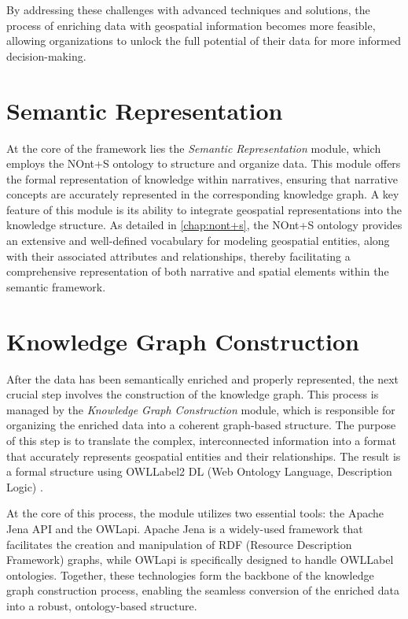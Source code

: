 By addressing these challenges with advanced techniques and solutions, the process of enriching data with geospatial information becomes more feasible, allowing organizations to unlock the full potential of their data for more informed decision-making.

\section{Semantic Representation}\label{VI-sec:semantic-representation}

At the core of the framework lies the \textit{Semantic Representation} module, which employs the NOnt+S ontology to structure and organize data. This module offers the formal representation of knowledge within narratives, ensuring that narrative concepts are accurately represented in the corresponding knowledge graph. A key feature of this module is its ability to integrate geospatial representations into the knowledge structure. As detailed in \ref{chap:nont+s}, the NOnt+S ontology provides an extensive and well-defined vocabulary for modeling geospatial entities, along with their associated attributes and relationships, thereby facilitating a comprehensive representation of both narrative and spatial elements within the semantic framework.

\section{Knowledge Graph Construction}\label{VI-sec:KG}

After the data has been semantically enriched and properly represented, the next crucial step involves the construction of the knowledge graph. This process is managed by the \textit{Knowledge Graph Construction} module, which is responsible for organizing the enriched data into a coherent graph-based structure. The purpose of this step is to translate the complex, interconnected information into a format that accurately represents geospatial entities and their relationships. The result is a formal structure using \acrshort{OWLLabel}2 DL (Web Ontology Language, Description Logic) \cite{OWLWebOntologyc}.

At the core of this process, the module utilizes two essential tools: the Apache Jena API\cite{ApacheJenaFramework} and the OWLapi\cite{OwlcsOwlapi2024}. Apache Jena is a widely-used framework that facilitates the creation and manipulation of RDF (Resource Description Framework) graphs, while OWLapi is specifically designed to handle \acrshort{OWLLabel} ontologies. Together, these technologies form the backbone of the knowledge graph construction process, enabling the seamless conversion of the enriched data into a robust, ontology-based structure.

